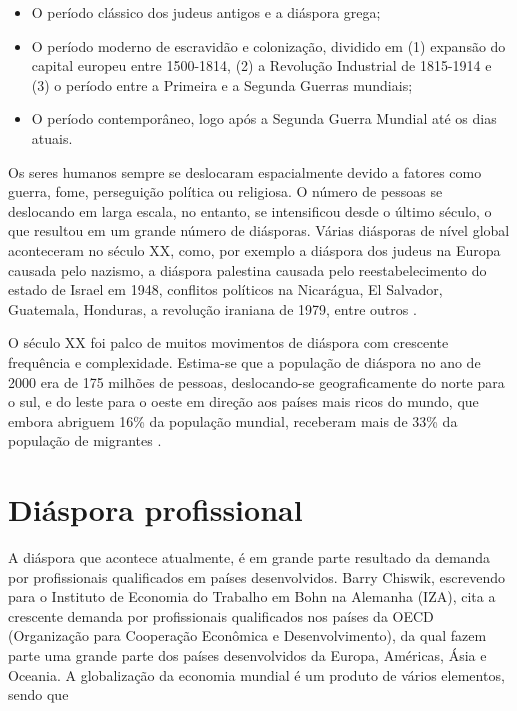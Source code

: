 \documentclass[12pt,openright,oneside,a4paper]{abntex2}
\begin{document}
\begin{itemize}
	\item O período clássico dos judeus antigos e a diáspora grega;
	\item O período moderno de escravidão e colonização, dividido em (1) expansão do capital europeu entre 1500-1814, (2) a Revolução Industrial de 1815-1914 e (3) o período entre a Primeira e a Segunda Guerras mundiais;
	\item O período contemporâneo, logo após a Segunda Guerra Mundial até os dias atuais.
	\cite[p. 41-60]{reis}
\end{itemize}

Os seres humanos sempre se deslocaram espacialmente devido a fatores como guerra, fome, perseguição política ou religiosa. O número de pessoas se deslocando em larga escala, no entanto, se intensificou desde o último século, o que resultou em um grande número de diásporas. Várias diásporas de nível global aconteceram no século XX, como, por exemplo a diáspora dos judeus na Europa causada pelo nazismo, a diáspora palestina causada pelo reestabelecimento do estado de Israel em 1948, conflitos políticos na Nicarágua, El Salvador, Guatemala, Honduras, a revolução iraniana de 1979, entre outros \cite[p. 25]{wan_diaspora_2011}.

O século XX foi palco de muitos movimentos de diáspora com crescente frequência e complexidade. Estima-se que a população de diáspora no ano de 2000 era de 175 milhões de pessoas, deslocando-se geograficamente do norte para o sul, e do leste para o oeste em direção aos países mais ricos do mundo, que embora abriguem 16\% da população mundial, receberam mais de 33\% da população de migrantes \cite[p. 26]{wan_diaspora_2011}.

\section{Diáspora profissional}

A diáspora que acontece atualmente, é em grande parte resultado da demanda por profissionais qualificados em países desenvolvidos. Barry Chiswik, escrevendo para o Instituto de Economia do Trabalho em Bohn na Alemanha (IZA), cita a crescente demanda por profissionais qualificados nos países da OECD (Organização para Cooperação Econômica e Desenvolvimento), da qual fazem parte uma grande parte dos países desenvolvidos da Europa, Américas, Ásia e Oceania. A globalização da economia mundial é um produto de vários elementos, sendo que 
\end{document}
